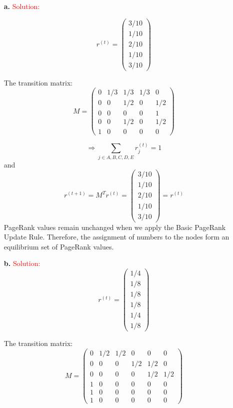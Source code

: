 \documentclass[11pt]{article} %
\begin{document}
\begin{itemize}
\item[\textbf{a. }]  \textcolor{red}{Solution:}

$$r^{(t)}=\left( \begin{array}{c}
3/10 \\
1/10 \\
2/10 \\
1/10 \\
3/10
\end{array}\right) $$

The transition matrix:
$$ M=\left( \begin{array}{ccccc}
0 & 1/3 & 1/3 & 1/3 & 0\\
0 & 0 &1/2 & 0 & 1/2 \\
0 & 0 &0 & 0 & 1\\
0 & 0 &1/2 & 0 & 1/2\\
1 & 0 &0 & 0 & 0
\end{array}\right) $$


$$\Rightarrow \sum_{j \in {A,B,C,D,E}} r_j^{(t)}=1$$
and
$$r^{(t+1)}=M^T r^{(t)}= \left( \begin{array}{c}
3/10 \\
1/10 \\
2/10 \\
1/10 \\
3/10
\end{array}\right) = r^{(t)}$$
PageRank values remain unchanged when we apply the Basic PageRank Update Rule. Therefore, the assignment of numbers to the nodes form an equilibrium set of PageRank values.


\item[\textbf{b. }]  \textcolor{red}{Solution:}
$$r^{(t)}=\left( \begin{array}{c}
1/4\\
1/8\\
1/8\\
1/8\\
1/4\\
1/8
\end{array}\right) $$

The transition matrix:
$$ M=\left( \begin{array}{cccccc}
0 & 1/2 & 1/2 & 0 & 0 & 0\\
0 & 0 & 0 &1/2 & 1/2 & 0\\
0 & 0 &0 & 0 &1/2 & 1/2\\
1 & 0 & 0 & 0 & 0 & 0\\
1 & 0 & 0 & 0 & 0 & 0\\
1 & 0 & 0 & 0 & 0 & 0
\end{array}\right) $$



\end{itemize}
\end{document}
